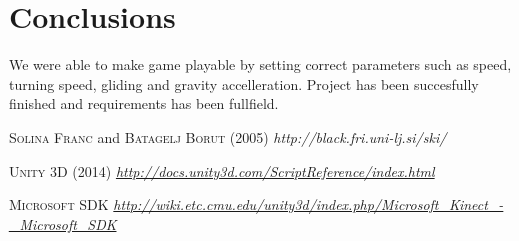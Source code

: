\documentclass[fonts]{icst}
\begin{document}
\section{Conclusions}
We were able to make game playable by setting correct parameters such as speed, turning speed, gliding and gravity accelleration. Project has been succesfully finished and requirements has been fullfield.

\begin{thebibliography}{9}

 \textsc{Solina Franc} and \textsc{Batagelj Borut} (2005) \emph{http://black.fri.uni-lj.si/ski/}

 \textsc{Unity 3D} (2014) \emph{\url{http://docs.unity3d.com/ScriptReference/index.html}}

 \textsc{Microsoft SDK} \emph{\url{http://wiki.etc.cmu.edu/unity3d/index.php/Microsoft_Kinect_-_Microsoft_SDK}}

\end{thebibliography}
\end{document}
